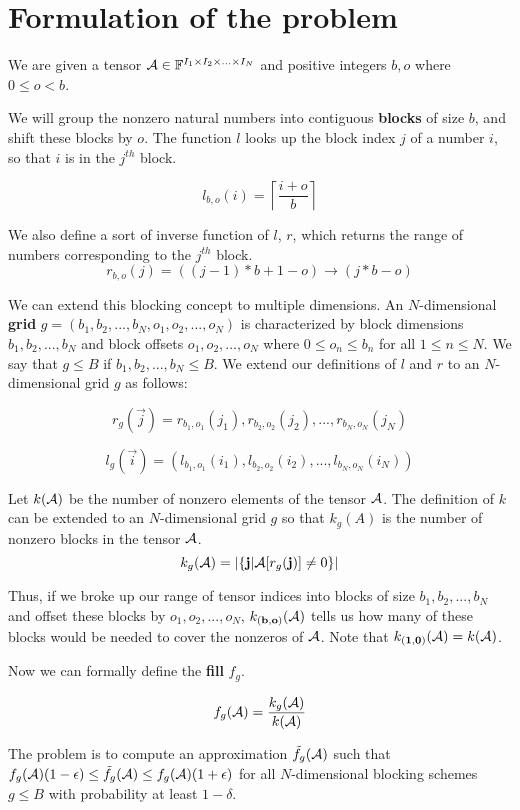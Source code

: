 
\section{Formulation of the problem}
    We are given a tensor $\mathbf{\mathcal{A}} \in \mathbb{F}^{I_1 \times I_2 \times ... \times I_N}$ and positive integers $b, o$ where $0 \leq o < b$.

    We will group the nonzero natural numbers into contiguous \textbf{blocks} of size $b$, and shift these blocks by $o$. The function $l$ looks up the block index $j$ of a number $i$, so that $i$ is in the $j^{th}$ block.

    \[
      l_{b, o}(i) = \left\lceil\frac{i + o}{b}\right\rceil
    \]

    We also define a sort of inverse function of $l$, $r$, which returns the range of numbers corresponding to the $j^{th}$ block.
    \[
      r_{b, o}(j) = ((j - 1) * b + 1 - o) \to (j * b - o)
    \]

    We can extend this blocking concept to multiple dimensions. An $N$-dimensional \textbf{grid} $g = (b_1, b_2, ..., b_N, o_1, o_2, ..., o_N)$ is characterized by block dimensions $b_1, b_2, ..., b_N$ and block offsets $o_1, o_2, ..., o_N$ where $0 \leq o_n \leq b_n$ for all $1 \leq n \leq N$. We say that $g \leq B$ if $b_1, b_2, ..., b_N \leq B$. We extend our definitions of $l$ and $r$ to an $N$-dimensional grid $g$ as follows:

    \[
      r_g(\vec{j}) = r_{b_1, o_1}(j_1), r_{b_2, o_2}(j_2), ..., r_{b_N, o_N}(j_N)
    \]

    \[
      l_g(\vec{i}) = (l_{b_1, o_1}(i_1), l_{b_2, o_2}(i_2), ..., l_{b_N, o_N}(i_N))
    \]

    Let $k(\mathbf{\mathcal{A}})$ be the number of nonzero elements of the tensor $\mathbf{\mathcal{A}}$. The definition of $k$ can be extended to an $N$-dimensional grid $g$ so that $k_g(A)$ is the number of nonzero blocks in the tensor $\mathbf{\mathcal{A}}$.
    \[
      k_g(\mathbf{\mathcal{A}}) = \left|\{\mathbf{j} | \mathbf{\mathcal{A}}[r_g(\mathbf{j})] \neq 0\}\right|
    \]

    Thus, if we broke up our range of tensor indices into blocks of size $b_1, b_2, ..., b_N$ and offset these blocks by $o_1, o_2, ..., o_N$, $k_{(\mathbf{b}, \mathbf{o})}(\mathbf{\mathcal{A}})$ tells us how many of these blocks would be needed to cover the nonzeros of $\mathbf{\mathcal{A}}$. Note that $k_{(\mathbf{1}, \mathbf{0})}(\mathbf{\mathcal{A}}) = k(\mathbf{\mathcal{A}})$.

    Now we can formally define the \textbf{fill} $f_g$.

    \[
      f_g(\mathbf{\mathcal{A}}) = \frac{k_g(\mathbf{\mathcal{A}})}{k(\mathbf{\mathcal{A}})}
    \]

    The problem is to compute an approximation $\tilde{f}_g(\mathbf{\mathcal{A}})$ such that $f_g(\mathbf{\mathcal{A}})(1 - \epsilon) \leq \tilde{f}_g(\mathbf{\mathcal{A}}) \leq f_g(\mathbf{\mathcal{A}})(1 + \epsilon)$ for all $N$-dimensional blocking schemes $g \leq B$ with probability at least $1 - \delta$.
